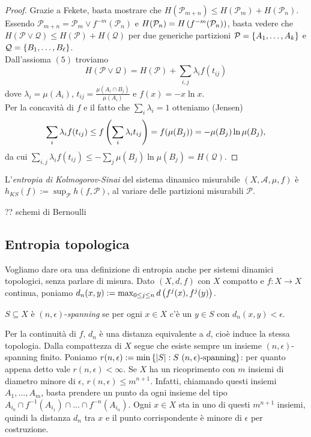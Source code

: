 \begin{proof}Grazie a Fekete, basta mostrare che $H(\mathcal{P}_{m+n})\le H(\mathcal{P}_m)+H(\mathcal{P}_n)$.
Essendo $\mathcal{P}_{m+n}=\mathcal{P}_m\vee f^{-m}(\mathcal{P}_n)$ e $H(\mathcal{P}_n)=H\left(f^{-m}(\mathcal{P}_n)\right)$,
basta vedere che $H(\mathcal{P}\vee\mathcal{Q})\le H(\mathcal{P})+H(\mathcal{Q})$ per due generiche
partizioni $\mathcal{P}=\left\{A_1,\dots,A_k\right\}$ e $\mathcal{Q}=\left\{B_1,\dots,B_\ell\right\}$. \\
Dall'assioma $(5)$ troviamo
\[ H(\mathcal{P}\vee\mathcal{Q})=H(\mathcal{P})+\sum_{i,j}\lambda_i f(t_{ij}) \]
dove $\lambda_i=\mu(A_i)$, $t_{ij}=\frac{\mu(A_i\cap B_j)}{\mu(A_i)}$ e $f(x)=-x\ln x$. \\
Per la concavità di $f$ e il fatto che $\sum_i\lambda_i=1$ otteniamo (Jensen)
\[ \sum_i \lambda_i f(t_{ij})\le f\left(\sum_i\lambda_i t_{ij}\right)=f(\mu(B_j))=-\mu(B_j)\ln\mu(B_j), \]
da cui $\sum_{i,j}\lambda_i f(t_{ij})\le -\sum_j \mu(B_j)\ln\mu(B_j)=H(\mathcal{Q})$.
\end{proof}

\begin{defi}L'\emph{entropia di Kolmogorov-Sinai} del sistema dinamico misurabile $(X,\mathcal{A},\mu,f)$ è
$h_{KS}(f):=\sup_{\mathcal{P}}h(f,\mathcal{P})$, al variare delle partizioni misurabili $\mathcal{P}$.
\end{defi}

?? schemi di Bernoulli

\subsection{Entropia topologica}

Vogliamo dare ora una definizione di entropia anche per sistemi dinamici topologici, senza parlare di misura.
Dato $(X,d,f)$ con $X$ compatto e $f:X\to X$ continua, poniamo $d_n(x,y):=\max_{0\le j\le n}d\left(f^j(x),f^j(y)\right)$.

\begin{defi}$S\subseteq X$ è $(n,\epsilon)$-\emph{spanning} se per ogni $x\in X$ c'è un $y\in S$
con $d_n(x,y)<\epsilon$.
\end{defi}

Per la continuità di $f$, $d_n$ è una distanza equivalente a $d$, cioè
induce la stessa topologia. Dalla compattezza di $X$ segue che esiste sempre un insieme $(n,\epsilon)$-spanning finito.
Poniamo $r(n,\epsilon):=\min\set{\abs{S}:S\ (n,\epsilon)\text{-spanning}}$: per quanto appena detto vale $r(n,\epsilon)<\infty$.
Se $X$ ha un ricoprimento con $m$ insiemi di diametro minore di $\epsilon$, $r(n,\epsilon)\le m^{n+1}$.
Infatti, chiamando questi insiemi $A_1,\dots,A_m$, basta prendere un punto da ogni insieme del tipo
$A_{i_0}\cap f^{-1}(A_{i_1})\cap\dots\cap f^{-n}(A_{i_n})$. Ogni $x\in X$ sta in uno di questi $m^{n+1}$ insiemi,
quindi la distanza $d_n$ tra $x$ e il punto corrispondente è minore di $\epsilon$ per costruzione.


